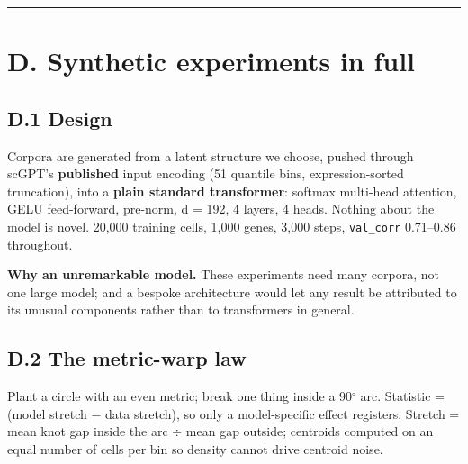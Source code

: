 \begin{center}\rule{0.5\linewidth}{0.5pt}\end{center}

\hypertarget{d.-synthetic-experiments-in-full}{%
\section{D. Synthetic experiments in full}\label{d.-synthetic-experiments-in-full}}

\hypertarget{d.1-design}{%
\subsection{D.1 Design}\label{d.1-design}}

Corpora are generated from a latent structure we choose, pushed through scGPT's \textbf{published} input
encoding (51 quantile bins, expression-sorted truncation), into a \textbf{plain standard transformer}:
softmax multi-head attention, GELU feed-forward, pre-norm, d = 192, 4 layers, 4 heads. Nothing about
the model is novel. 20,000 training cells, 1,000 genes, 3,000 steps, \texttt{val\_corr} 0.71--0.86 throughout.

\textbf{Why an unremarkable model.} These experiments need many corpora, not one large model;
and a bespoke architecture would let any result be attributed to its unusual components rather than to
transformers in general.

\hypertarget{d.2-the-metric-warp-law}{%
\subsection{D.2 The metric-warp law}\label{d.2-the-metric-warp-law}}

Plant a circle with an even metric; break one thing inside a 90\(^{\circ}\) arc. Statistic = (model stretch \(-\) data
stretch), so only a model-specific effect registers. Stretch = mean knot gap inside the arc \(\div\) mean gap
outside; centroids computed on an equal number of cells per bin so density cannot drive centroid noise.

